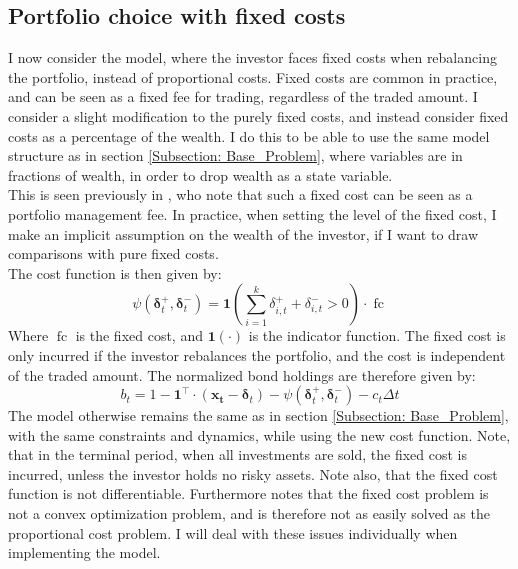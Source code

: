 \documentclass[11pt]{article}
\begin{document}
\subsection{Portfolio choice with fixed costs}
I now consider the model, where the investor faces fixed costs when rebalancing the portfolio, instead of proportional costs.
Fixed costs are common in practice, and can be seen as a fixed fee for trading, regardless of the traded amount.
I consider a slight modification to the purely fixed costs, and instead consider fixed costs as a percentage of the wealth.
I do this to be able to use the same model structure as in section \ref{Subsection: Base_Problem}, where variables are in fractions of wealth,
in order to drop wealth as a state variable.\\
This is seen previously in \autocite{morton1995optimal}, who note that such a fixed cost can be seen as a portfolio management fee.
In practice, when setting the level of the fixed cost, I make an implicit assumption on the wealth of the investor,
if I want to draw comparisons with pure fixed costs.\\
The cost function is then given by:
\begin{equation}
  \label{eq:Fixed_Cost_Function}
  \psi (\boldsymbol{\delta}^{+}_{t}, \boldsymbol{\delta}^{-}_{t} ) = \mathbf{1} \left(  \sum^{k}_{i=1} \delta^{+}_{i,t} + \delta^{-}_{i,t}  > 0 \right) \cdot \operatorname{fc}
\end{equation}
Where $\operatorname{fc}$ is the fixed cost, and $\mathbf{1}(\cdot)$ is the indicator function.
The fixed cost is only incurred if the investor rebalances the portfolio, and the cost is independent of the traded amount.
The normalized bond holdings are therefore given by:
\begin{equation}\label{eq: fx_bond_holdings}
  b_{t} = 1 - \mathbf{1}^{\top} \cdot (\mathbf{x_t} - \boldsymbol{\delta}_t) - \psi( \boldsymbol{\delta}^{+}_{t}, \boldsymbol{\delta}^{-}_{t} ) - c_t \Delta t
\end{equation}
The model otherwise remains the same as in section \ref{Subsection: Base_Problem}, with the same constraints and dynamics, while using the new cost function.
Note, that in the terminal period, when all investments are sold, the fixed cost is incurred, unless the investor holds no risky assets.
Note also, that the fixed cost function is not differentiable. Furthermore \autocite{Dybvig2020} notes that the fixed cost problem
is not a convex optimization problem, and is therefore not as easily solved as the proportional cost problem. I will deal with these issues individually
when implementing the model.
\end{document}
